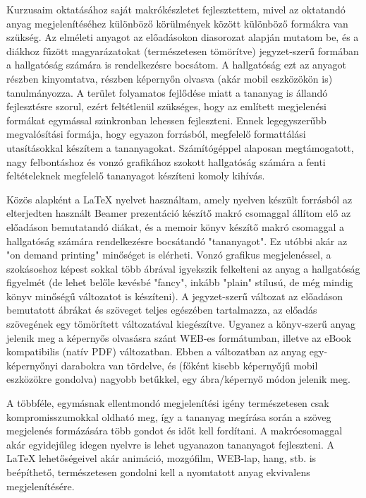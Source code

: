 {
Kurzusaim oktatásához saját makrókészletet fejlesztettem, mivel az oktatandó anyag megjelenítéséhez
különböző körülmények között különböző formákra van szükség. Az elméleti anyagot az előadásokon
diasorozat alapján mutatom be, és a diákhoz fűzött magyarázatokat (természetesen tömörítve) 
jegyzet-szerű formában a hallgatóság számára is rendelkezésre bocsátom. A hallgatóság ezt az 
anyagot részben kinyomtatva, részben képernyőn olvasva (akár mobil eszközökön is) tanulmányozza.
A terület folyamatos fejlődése miatt a tananyag is állandó fejlesztésre szorul, ezért feltétlenül
szükséges, hogy az említett megjelenési formákat egymással szinkronban lehessen fejleszteni.
Ennek legegyszerűbb megvalósítási formája, hogy egyazon forrásból, megfelelő formattálási utasításokkal
készítem a tananyagokat.
Számítógéppel alaposan megtámogatott, nagy felbontáshoz és vonzó grafikához
szokott hallgatóság számára a fenti feltételeknek megfelelő tananyagot készíteni komoly kihívás.

Közös alapként a LaTeX nyelvet használtam, amely nyelven készült forrásból az elterjedten használt
Beamer prezentáció készítő makró csomaggal állítom elő az előadáson bemutatandó diákat, és a memoir
könyv készítő makró csomaggal a hallgatóság számára rendelkezésre bocsátandó "tananyagot". Ez utóbbi
akár az "on demand printing" minőséget is elérheti. Vonzó grafikus megjelenéssel, a szokásoshoz képest 
sokkal több ábrával igyekszik felkelteni az anyag a hallgatóság figyelmét (de lehet belőle kevésbé "fancy",
inkább "plain" stílusú, de még mindig könyv minőségű változatot is készíteni). A jegyzet-szerű 
változat az előadáson bemutatott ábrákat és szöveget teljes egészében tartalmazza, az előadás
szövegének egy tömörített változatával kiegészítve. Ugyanez a könyv-szerű anyag jelenik meg a képernyős
olvasásra szánt WEB-es formátumban, illetve az eBook kompatibilis (natív PDF) változatban. Ebben a változatban az anyag egy-képernyőnyi darabokra van tördelve,
és (főként kisebb képernyőjű mobil eszközökre gondolva) nagyobb betűkkel, egy ábra/képernyő módon
jelenik meg.

A többféle, egymásnak ellentmondó megjelenítési igény természetesen csak kompromisszumokkal
oldható meg, így a tananyag megírása során a szöveg megjelenés formázására több gondot és időt kell fordítani.
A makrócsomaggal akár egyidejűleg idegen nyelvre is lehet ugyanazon tananyagot fejleszteni.
A LaTeX lehetőségeivel akár animáció, mozgófilm, WEB-lap, hang, stb. is beépíthető, természetesen gondolni
kell a nyomtatott anyag ekvivalens megjelenítésére.
}

